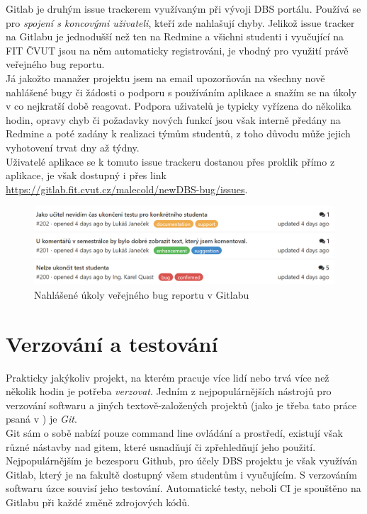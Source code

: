 Gitlab je druhým issue trackerem využívaným při vývoji DBS portálu. Používá se pro \emph{spojení s koncovými uživateli}, kteří zde nahlašují chyby. Jelikož issue tracker na Gitlabu je jednodušší než ten na Redmine a všichni studenti i vyučující na FIT ČVUT jsou na něm automaticky registrováni, je vhodný pro využití právě veřejného bug reportu.\\
Já jakožto manažer projektu jsem na email upozorňován na všechny nově nahlášené bugy či žádosti o podporu s používáním aplikace a snažím se na úkoly v co nejkratší době reagovat. Podpora uživatelů je typicky vyřízena do několika hodin, opravy chyb či požadavky nových funkcí jsou však interně předány na Redmine a poté zadány k realizaci týmům studentů, z toho důvodu může jejich vyhotovení trvat dny až týdny.\\
Uživatelé aplikace se k tomuto issue trackeru dostanou přes proklik přímo z aplikace, je však dostupný i přes link \url{https://gitlab.fit.cvut.cz/malecold/newDBS-bug/issues}.
\begin{figure}[h]
\includegraphics[width=\textwidth]{../png/gitlab-bug.png}
\caption{Nahlášené úkoly veřejného bug reportu v Gitlabu} \label{picture:gitlab-bug}
\end{figure}


\section{Verzování a testování}

Prakticky jakýkoliv projekt, na kterém pracuje více lidí nebo trvá více než několik hodin je potřeba \emph{verzovat}. Jedním z nejpopulárnějších nástrojů pro verzování softwaru a jiných textově-založených projektů (jako je třeba tato práce psaná v \XeLaTeX) je \emph{Git}.\\
Git sám o sobě nabízí pouze command line ovládání a prostředí, existují však různé nástavby nad gitem, které usnadňují či zpřehledňují jeho použití. Nejpopulárnějším je bezesporu Github, pro účely DBS projektu je však využíván Gitlab, který je na fakultě dostupný všem studentům i vyučujícím.
S verzováním softwaru úzce souvisí jeho testování. Automatické testy, neboli CI je spouštěno na Gitlabu při každé změně zdrojových kódů.

